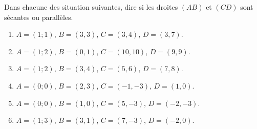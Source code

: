 
\begin{exercice}\label{exosmath-0109}

    Dans chacune des situation suivantes, dire si les droites \( (AB)\) et \( (CD)\) sont sécantes ou parallèles.
    \begin{multicols}{2}
        \begin{enumerate}
            \item
                \( A=(1;1)\), \( B=(3,3)\), \( C=(3,4)\), \( D=(3,7)\). 
            \item
                \( A=(1;2)\), \( B=(0,1)\), \( C=(10,10)\), \( D=(9,9)\). 
            \item
                \( A=(1;2)\), \( B=(3,4)\), \( C=(5,6)\), \( D=(7,8)\). 
            \item
                \( A=(0;0)\), \( B=(2,3)\), \( C=(-1,-3)\), \( D=(1,0)\). 
            \item
                \( A=(0;0)\), \( B=(1,0)\), \( C=(5,-3)\), \( D=(-2,-3)\). 
            \item
                \( A=(1;3)\), \( B=(3,1)\), \( C=(7,-3)\), \( D=(-2,0)\). 
        \end{enumerate}
    \end{multicols}

\end{exercice}
